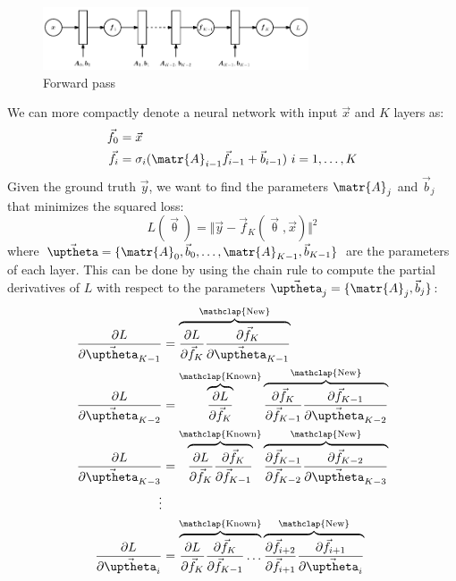 \begin{figure}[ht]
    \centering
    \includegraphics[width=0.7\textwidth]{img/_forward_pass.pdf}
    \caption{Forward pass}
\end{figure}

We can more compactly denote a neural network with input $\vec{x}$ and $K$ layers as:
\[ 
    \begin{split}
        \vec{f}_0 &= \vec{x} \\
        \vec{f}_i &= \sigma_i(\matr{A}_{i-1} \vec{f}_{i-1} + \vec{b}_{i-1}) \text{ } i=1, \dots, K
    \end{split}
\]
Given the ground truth $\vec{y}$, we want to find the parameters $\matr{A}_j$ and $\vec{b}_j$ that minimizes the squared loss:
\[ L(\vec{\uptheta}) = \Vert \vec{y} - \vec{f}_K(\vec{\uptheta}, \vec{x}) \Vert^2 \]
where $\vec{\uptheta} = \{ \matr{A}_{0}, \vec{b}_{0}, \dots, \matr{A}_{K-1}, \vec{b}_{K-1} \}$ are the parameters of each layer.
This can be done by using the chain rule to compute the partial derivatives of $L$ with respect to the parameters $\vec{\uptheta}_j = \{ \matr{A}_j, \vec{b}_j \}$:
\[
    \begin{split}
        \frac{\partial L}{\partial \vec{\uptheta}_{K-1}} &= 
            \overbrace{\frac{\partial L}{\partial \vec{f}_K} \frac{\partial \vec{f}_K}{\partial \vec{\uptheta}_{K-1}}}^{\mathclap{\text{New}}} \\
        \frac{\partial L}{\partial \vec{\uptheta}_{K-2}} &= 
            \overbrace{\frac{\partial L}{\partial \vec{f}_K}}^{\mathclap{\text{Known}}}
            \overbrace{\frac{\partial \vec{f}_K}{\partial \vec{f}_{K-1}} \frac{\partial \vec{f}_{K-1}}{\partial \vec{\uptheta}_{K-2}}}^{\mathclap{\text{New}}} \\
        \frac{\partial L}{\partial \vec{\uptheta}_{K-3}} &= 
            \overbrace{\frac{\partial L}{\partial \vec{f}_K} \frac{\partial \vec{f}_K}{\partial \vec{f}_{K-1}}}^{\mathclap{\text{Known}}}
            \overbrace{\frac{\partial \vec{f}_{K-1}}{\partial \vec{f}_{K-2}} \frac{\partial \vec{f}_{K-2}}{\partial \vec{\uptheta}_{K-3}}}^{\mathclap{\text{New}}} \\
        \vdots \\
        \frac{\partial L}{\partial \vec{\uptheta}_{i}} &= 
            \overbrace{\frac{\partial L}{\partial \vec{f}_K} \frac{\partial \vec{f}_K}{\partial \vec{f}_{K-1}} \dots}^{\mathclap{\text{Known}}}
            \overbrace{\frac{\partial \vec{f}_{i+2}}{\partial \vec{f}_{i+1}} \frac{\partial \vec{f}_{i+1}}{\partial \vec{\uptheta}_{i}}}^{\mathclap{\text{New}}}
    \end{split}
\]

